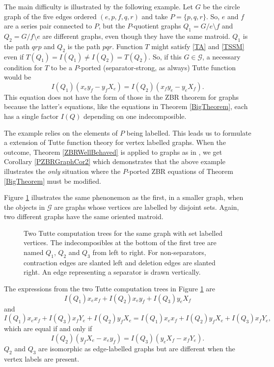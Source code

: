 \documentclass[12pt,leqno]{amsart}
\theoremstyle{remark}
\begin{document}
The main difficulty is illustrated by the following example.
Let
$G$ be the circle graph of the five edges
ordered $(e,p,f,q,r)$ and take $P=\{p,q,r\}$.  
So, $e$ and $f$ are a series pair connected to $P$, but
the $P$-quotient graphs $Q_1=G/e\setminus f$ and 
$Q_2=G/f\setminus e$ are different graphs, even though they have 
the same matroid.  $Q_1$ is the path $qrp$ and $Q_2$ is the path $pqr$.
Function $T$ might satisfy \eqref{TA}
and \eqref{TSSM} even if $T(Q_1)=I(Q_1)\neq I(Q_2)=T(Q_2)$.
So, if this $G\in\mathcal{G}$, a necessary condition 
for $T$ to be a $P$-ported
(separator-strong, as always) Tutte function would be
\[
I(Q_1)(x_ey_f - y_fX_e) = I(Q_2)(x_fy_e - y_eX_f).
\]
This equation does not have the form of 
those in the ZBR theorem for graphs \cite{Ellis-Monaghan-Traldi}
because the latter's equations, like the equations in
Theorem \ref{BigTheorem}, each has a single factor 
$I(Q)$ depending on one indecomposible.


The example relies on the elements of $P$ being labelled.
This leads us to formulate a extension of Tutte function theory
for vertex labelled graphs.  
When the outcome, Theorem \ref{ZBRWellBehaved} is applied to graphs as in 
\cite{Ellis-Monaghan-Traldi}, we get Corollary \ref{PZBRGraphCor2}
which demonstrates that the above example illustrates the
\emph{only} situation where the $P$-ported ZBR equations
of Theorem \ref{BigTheorem} must be modified.

Figure \ref{c4p2TwoFigure} illustrates 
the same phenonemon as the first, in a smaller graph, when
the objects in $\mathcal{G}$ are graphs whose vertices are 
labelled by disjoint sets.  Again, two different graphs have the
same oriented matroid.

\begin{figure}

\caption{\label{c4p2TwoFigure}
Two Tutte computation trees for the same graph with set labelled
vertices.  The indecomposibles at the bottom of the first tree
are named $Q_1$, $Q_2$ and $Q_3$ from left to right.  For non-separators,
contraction 
edges are slanted left and  deletion edges are slanted right.  An edge
representing a separator is drawn vertically.}
\end{figure}

The expressions from the two Tutte computation trees in Figure
\ref{c4p2TwoFigure}
are 
\[
I(Q_1)x_ex_f+I(Q_2)x_ey_f+I(Q_3)y_eX_f
\]
and
\[
I(Q_1)x_ex_f+I(Q_3)x_fY_e+I(Q_2)y_fX_e=
I(Q_1)x_ex_f+I(Q_2)y_fX_e+I(Q_3)x_fY_e,
\]
which are equal if and only if
\begin{equation}
\label{BadZBRExampleEq}
I(Q_2)(y_fX_e - x_ey_f)=
I(Q_3)(y_eX_f - x_fY_e).
\end{equation}
$Q_2$ and $Q_3$ are isomorphic as edge-labelled graphs
but are different when the vertex
labels are present.
\end{document}
